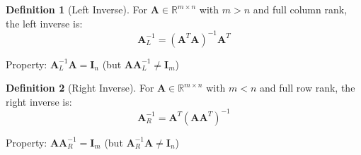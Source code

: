 \documentclass[12pt,a4paper]{article}
\theoremstyle{definition}
\newtheorem{definition}{Definition}[section]
\begin{document}
\begin{definition}[Left Inverse]
For $\mathbf{A} \in \mathbb{R}^{m \times n}$ with $m > n$ and full column rank, the left inverse is:
\begin{equation}
\mathbf{A}_L^{-1} = (\mathbf{A}^T\mathbf{A})^{-1}\mathbf{A}^T
\end{equation}

Property: $\mathbf{A}_L^{-1}\mathbf{A} = \mathbf{I}_n$ (but $\mathbf{A}\mathbf{A}_L^{-1} \neq \mathbf{I}_m$)
\end{definition}

\begin{definition}[Right Inverse]
For $\mathbf{A} \in \mathbb{R}^{m \times n}$ with $m < n$ and full row rank, the right inverse is:
\begin{equation}
\mathbf{A}_R^{-1} = \mathbf{A}^T(\mathbf{A}\mathbf{A}^T)^{-1}
\end{equation}

Property: $\mathbf{A}\mathbf{A}_R^{-1} = \mathbf{I}_m$ (but $\mathbf{A}_R^{-1}\mathbf{A} \neq \mathbf{I}_n$)
\end{definition}
\end{document}
